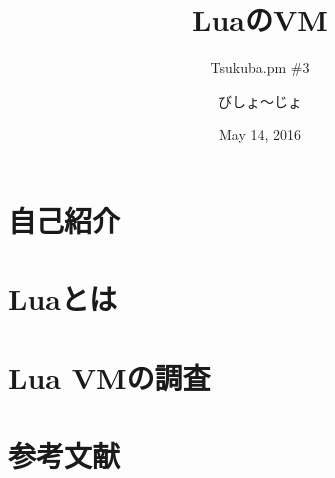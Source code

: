 \documentclass[aspectratio=169,unicode]{beamer}
\title{LuaのVM}
\subtitle{Tsukuba.pm \#{}3}
\author{びしょ〜じょ}
\date{May 14, 2016}
\begin{document}
\maketitle
\skipnexttoc
\section{自己紹介}

\section{Luaとは}

\section{Lua VMの調査}

\skipnexttoc
\section{参考文献}

\end{document}
